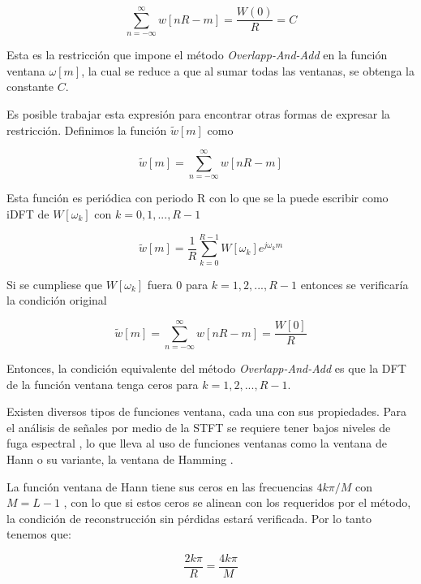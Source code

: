 \begin{equation*}
	\sum_{n=-\infty}^{\infty} w[nR-m] = \frac{W(0)}{R} = C
\end{equation*}

Esta es la restricción que impone el método \emph{Overlapp-And-Add} en la función ventana $\omega[m]$, la cual se reduce a que al sumar todas las ventanas, se obtenga la constante $C$. 

Es posible trabajar esta expresión para encontrar otras formas de expresar la restricción. Definimos la función  $\tilde{w}[m]$ como

\begin{equation*}
	\tilde{w}[m] = \sum_{n=-\infty}^{\infty} w[nR-m]
\end{equation*}

Esta función es periódica con periodo R con lo que se la puede escribir como iDFT de $W[\omega_k]$ con $k = 0, 1, ..., R-1$

\begin{equation*}
	\tilde{w}[m] = \frac{1}{R} \sum_{k=0}^{R-1} W[\omega_{k}] e^{j \omega_{k} m}
\end{equation*}

Si se cumpliese que $W[\omega_{k}]$ fuera 0 para $k = 1, 2, ..., R-1$ entonces se verificaría la condición original

\begin{equation*}
	\tilde{w}[m] = \sum_{n=-\infty}^{\infty} w[nR-m] = \frac{W[0]}{R}
\end{equation*}

Entonces, la condición equivalente del método \emph{Overlapp-And-Add} es que la DFT de la función ventana tenga ceros para $k = 1, 2, ..., R-1$.

Existen diversos tipos de funciones ventana, cada una con sus propiedades. Para el análisis de señales por medio de la STFT se requiere tener bajos niveles de fuga espectral \cite{speech_enhancement_theory_and_practice}, lo que lleva al uso de funciones ventanas como la ventana de Hann o su variante, la ventana de Hamming \cite{oppenheim_schafer}.

La función ventana de Hann tiene sus ceros en las frecuencias $4 k \pi/M$ con $M = L - 1$ \cite{oppenheim_schafer}, con lo que si estos ceros se alinean con los requeridos por el método, la condición de reconstrucción sin pérdidas estará verificada. Por lo tanto tenemos que:

\begin{equation*}
	\frac{2k\pi}{R} = \frac{4 k \pi}{M}
\end{equation*}

